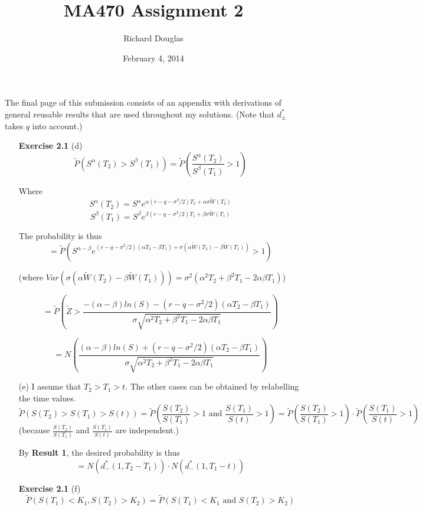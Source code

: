 \documentclass{article}[12pt,a4paper]
\title{MA470 Assignment 2}
\author{Richard Douglas}
\date{February 4,  2014} %
\begin{document}
  \maketitle
  The final page of this submission consists of an appendix with derivations of general reusable results that 
  are used throughout my solutions. (Note that $d_\pm^*$ takes $q$ into account.)\newline
  \begin{enumerate}
  \item[\textbf{Exercise 2.1}] 
  (d) 
  $$\widetilde{P}(S^{\alpha}(T_2) > S^{\beta}(T_1)) = \widetilde{P}(\frac{S^{\alpha}(T_2)}{S^{\beta}(T_1)} > 1)$$
      
      Where 
      $$S^\alpha(T_2) = S^\alpha e^{\alpha(r - q -\sigma^2/2)T_2 + \alpha\sigma\widetilde{W}(T_2)}$$
      $$S^\beta(T_1) = S^\beta e^{\beta(r - q - \sigma^2/2)T_1 + \beta\sigma\widetilde{W}(T_1)}$$
      
      The probability is thus
      $$= \widetilde{P}(S^{\alpha - \beta}e^{(r - q - \sigma^2/2)(\alpha T_2 - \beta T_1) + 
       \sigma(\alpha\widetilde{W}(T_2) - \beta\widetilde{W}(T_1)) } > 1)$$
       
       \hfill (where
       $Var(\sigma(\alpha\widetilde{W}(T_2) - \beta\widetilde{W}(T_1)))
       = \sigma^2(\alpha^2T_2 + \beta^2T_1 - 2\alpha\beta T_1)$)
   
       $$= \widetilde{P}(\widetilde{Z} >  
       \frac{- (\alpha - \beta)ln(S) - (r - q - \sigma^2/2)(\alpha T_2 - \beta T_1)}
       { \sigma\sqrt{\alpha^2T_2 + \beta^2T_1 - 2\alpha\beta T_1}})$$
       
       $$= N(\frac{(\alpha - \beta)ln(S) +  (r - q - \sigma^2/2)(\alpha T_2 - \beta T_1)}
       {\sigma\sqrt{\alpha^2T_2 + \beta^2T_1 - 2\alpha\beta T_1}})$$ \newline
      
  (e) I assume that $T_2 > T_1 > t$. The other cases can be obtained by relabelling the time values.
  $$\widetilde{P}(S(T_2) > S(T_1) > S(t)) = 
  \widetilde{P}(\frac{S(T_2)}{S(T_1)} > 1 \mbox{ and } \frac{S(T_1)}{S(t)} > 1)
  = \widetilde{P}(\frac{S(T_2)}{S(T_1)} > 1) \cdot \widetilde{P}(\frac{S(T_1)}{S(t)} > 1)$$
  \hfill(because $\frac{S(T_2)}{S(T_1)}$ and $\frac{S(T_1)}{S(t)}$ are independent.)
  
  By \textbf{Result 1}, the desired probability is thus
  $$= N(d_-^*(1,T_2 - T_1)) \cdot N(d_-^*(1,T_1 - t))$$ \newline
  \pagebreak
  
  \item[\textbf{Exercise 2.1}]
  (f) $$\widetilde{P}(S(T_1) < K_1, S(T_2) > K_2)
  = \widetilde{P}(S(T_1) < K_1 \mbox{ and } S(T_2) > K_2)$$
  

\end{enumerate}
\end{document}
